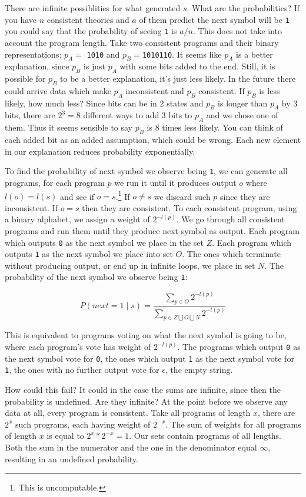 There are infinite possiblities for what generated $s$.
What are the probabilities?
If you have $n$ consistent theories and $a$ of them predict the next symbol will be \texttt{1} you could say that the probability of seeing \texttt{1} is $a/n$.
This does not take into account the program length.
Take two consistent programs and their binary representations: $p_A =$ \texttt{1010} and $p_B = $\texttt{1010110}.
It seems like $p_A$ is a better explanation, since $p_B$ is just $p_A$ with some bits added to the end.
Still, it is possible for $p_B$ to be a better explanation, it's just less likely.
In the future there could arrive data which make $p_A$ inconsistent and $p_B$ consistent.
If $p_B$ is less likely, how much less?
Since bits can be in 2 states and $p_B$ is longer than $p_A$ by 3 bits, there are $2^{3} = 8$ different ways to add 3 bits to $p_A$ and we chose one of them.
Thus it seems sensible to say $p_B$ is 8 times less likely.
You can think of each added bit as an added assumption, which could be wrong.
Each new element in our explanation reduces probability exponentially. 

To find the probability of next symbol we observe being \texttt{1}, we can generate all programs, for each program $p$ we run it until it produces output $o$ where $l(o) = l(s)$ and see if $o = s$.\footnote{This is uncomputable.}
If $o \neq s$ we discard such $p$ since they are inconsistent.
If $o = s$ then they are consistent.
To each consistent program, using a binary alphabet, we assign a weight of $2^{-l(p)}$.
We go through all consistent programs and run them until they produce next symbol as output.
Each program which outputs \texttt{0} as the next symbol we place in the set $Z$.
Each program which outputs \texttt{1} as the next symbol we place into set $O$.
The ones which terminate without producing output, or end up in infinite loops, we place in set $N$.
The probability of the next symbol we observe being \texttt{1}:

$$\displaystyle P(next=1 \mid s) = \frac{\sum\limits_{p \in O} 2^{-l(p)}}{\sum\limits_{p \in Z \bigcup O \bigcup N} 2^{-l(p)}}$$

This is equivalent to programs voting on what the next symbol is going to be, where each program's vote has weight of $2^{-l(p)}$.
The programs which output \texttt{0} as the next symbol vote for \texttt{0}, the ones which output \texttt{1} as the next symbol vote for \texttt{1}, the ones with no further output vote for $\epsilon$, the empty string.

How could this fail?
It could in the case the sums are infinite, since then the probability is undefined.
Are they infinite?
At the point before we observe any data at all, every program is consistent.
Take all programs of length $x$, there are $2^x$ such programs, each having weight of $2^{-x}$.
The sum of weights for all programs of length $x$ is equal to $2^x * 2^{-x} = 1$.
Our sets contain programs of all lengths.
Both the sum in the numerator and the one in the denominator equal $\infty$, resulting in an undefined probability.

